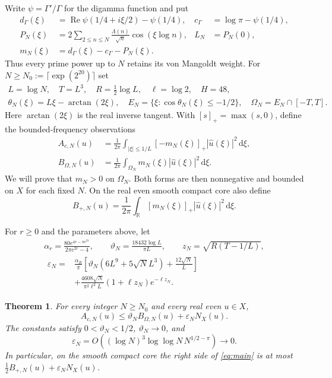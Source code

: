 \documentclass[11pt]{article}
\newtheorem{theorem}{Theorem}[section]
\theoremstyle{remark}\newtheorem{remark}[theorem]{Remark}
\newcommand{\R}{\mathbb R}
\newcommand{\dd}{\,\mathrm d}
\newcommand{\NX}{N_X}
\numberwithin{equation}{section}
\begin{document}
Write $\psi=\Gamma'/\Gamma$ for the digamma function and put
\begin{align}
 d_\Gamma(\xi)&=\operatorname{Re}\psi(1/4+i\xi/2)-\psi(1/4),&
 c_\Gamma&=\log\pi-\psi(1/4),\label{eq:gamma}\\
 P_N(\xi)&=2\sum_{2\le n\le N}\frac{\Lambda(n)}{\sqrt n}\cos(\xi\log n),&
 L_N&=P_N(0),\label{eq:PN}\\
 m_N(\xi)&=d_\Gamma(\xi)-c_\Gamma-P_N(\xi).&&\label{eq:mN}
\end{align}
Thus every prime power up to $N$ retains its von Mangoldt weight.
For $N\ge N_0:=\lceil\exp(2^{20})\rceil$ set
\begin{gather}
 L=\log N,\quad T=L^3,\quad R=\tfrac12\log L,\quad
 \ell=\log2,\quad H=48,\label{eq:parameters}\\
 \theta_N(\xi)=L\xi-\arctan(2\xi),\quad
 E_N=\{\xi:\cos\theta_N(\xi)\le-1/2\},\quad
 \Omega_N=E_N\cap[-T,T].\label{eq:omega}
\end{gather}
Here $\arctan(2\xi)$ is the real inverse tangent. With $[s]_+=\max(s,0)$, define the bounded-frequency observations
\begin{align}
 A_{c,N}(u)&=\frac1{2\pi}\int_{|\xi|\le1/L}[-m_N(\xi)]_+|\widehat u(\xi)|^2\dd\xi,\label{eq:Ac}\\
 B_{\Omega,N}(u)&=\frac1{2\pi}\int_{\Omega_N}m_N(\xi)|\widehat u(\xi)|^2\dd\xi.\label{eq:BO}
\end{align}
We will prove that $m_N>0$ on $\Omega_N$. Both forms are then nonnegative and bounded on $X$ for each fixed $N$. On the real even smooth compact core also define
\begin{equation}\label{eq:Bplus}
 B_{+,N}(u)=\frac1{2\pi}\int_\R[m_N(\xi)]_+|\widehat u(\xi)|^2\dd\xi.
\end{equation}

For $r\ge0$ and the parameters above, let
\begin{gather}
 \alpha_r=\frac{80e^{4r-\pi e^{2r}}}{2\pi e^{2r}-4},\qquad
 \vartheta_N=\frac{18432\log L}{\pi L},\qquad
 z_N=\sqrt{R(T-1/L)},\label{eq:constants}\\
 \begin{split}
 \varepsilon_N={}&\frac{\alpha_R}{\pi}
 \left[\vartheta_N(6L^9+5\sqrt N L^3)+\frac{12\sqrt N}{L}\right]\\
 &+\frac{4608\sqrt N}{\pi^2\ell^2 L}(1+\ell z_N)e^{-\ell z_N}.
 \end{split}\label{eq:epsilon}
\end{gather}

\begin{theorem}\label{thm:main}
For every integer $N\ge N_0$ and every real even $u\in X$,
\begin{equation}\label{eq:main}
 A_{c,N}(u)\le\vartheta_N B_{\Omega,N}(u)+\varepsilon_N\NX(u).
\end{equation}
The constants satisfy $0<\vartheta_N<1/2$, $\vartheta_N\to0$, and
\begin{equation}\label{eq:rate}
 \varepsilon_N=O\!\left((\log N)^3\log\log N\,N^{1/2-\pi}\right)
 \longrightarrow0.
\end{equation}
In particular, on the smooth compact core the right side of \eqref{eq:main} is at most $\tfrac12 B_{+,N}(u)+\varepsilon_N\NX(u)$.
\end{theorem}
\end{document}
